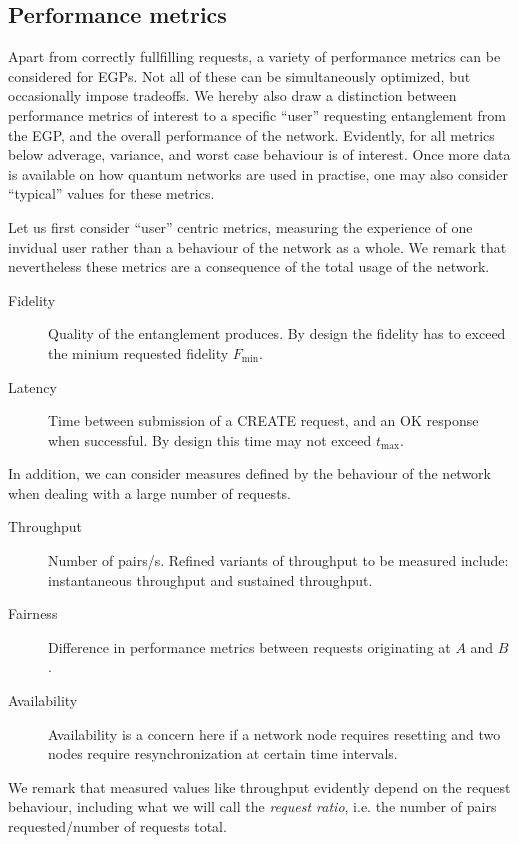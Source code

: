 \documentclass{article}
\begin{document}
\subsection{Performance metrics}

Apart from correctly fullfilling requests, a variety of performance metrics can be considered for EGPs. Not all of these can be simultaneously optimized, but occasionally impose tradeoffs.
We hereby also draw a distinction between performance metrics of interest to a specific ``user'' requesting entanglement from the EGP, and the overall performance of the network. 
Evidently, for all metrics below adverage, variance, and worst case behaviour is of interest. Once more data is available on how quantum networks are used in practise, one may also consider ``typical'' values for these metrics.

Let us first consider ``user'' centric metrics, measuring the experience of one invidual user rather than a behaviour of the network as a whole. We remark that nevertheless these metrics
are a consequence of the total usage of the network.
\begin{description}
\item[Fidelity] Quality of the entanglement produces. By design the fidelity has to exceed the minium requested fidelity $F_{\min}$. 
\item[Latency] Time between submission of a CREATE request, and an OK response when successful. By design this time may not exceed $t_{\max}$.
\end{description}
In addition, we can consider measures defined by the behaviour of the network when dealing with a large number of requests.
\begin{description}
\item[Throughput] Number of pairs/s. Refined variants of throughput to be measured include: instantaneous throughput and sustained throughput.
\item[Fairness] Difference in performance metrics between requests originating at $A$ and $B$.
\item[Availability] Availability is a concern here if a network node requires resetting and two nodes require resynchronization at certain time intervals.
\end{description}
We remark that measured values like throughput evidently depend on the request behaviour, including what we will call the \emph{request ratio}, i.e. the number of pairs requested/number of requests total. 
\end{document}
